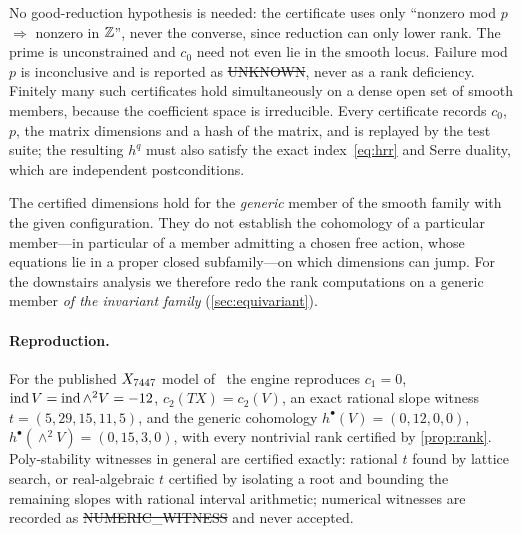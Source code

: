 No good-reduction hypothesis is needed: the certificate uses only
``nonzero mod $p$ $\Rightarrow$ nonzero in $\mathbb{Z}$'', never the converse, since
reduction can only lower rank. The prime is unconstrained and $c_0$ need not
even lie in the smooth locus. Failure mod $p$ is inconclusive and is reported as
\st{UNKNOWN}, never as a rank deficiency. Finitely many such certificates hold
simultaneously on a dense open set of smooth members, because the coefficient
space is irreducible. Every certificate records $c_0$, $p$, the matrix
dimensions and a hash of the matrix, and is replayed by the test suite; the
resulting $h^q$ must also satisfy the exact index~\eqref{eq:hrr} and Serre
duality, which are independent postconditions.

\begin{remark}[Scope]
The certified dimensions hold for the \emph{generic} member of the smooth
family with the given configuration. They do not establish the cohomology of a
particular member---in particular of a member admitting a chosen free action,
whose equations lie in a proper closed subfamily---on which dimensions can jump.
For the downstairs analysis we therefore redo the rank computations on a
generic member \emph{of the invariant family} (\cref{sec:equivariant}).
\end{remark}

\paragraph{Reproduction.} For the published $X_{7447}$ model of~\cite{ACGLP2013}
the engine reproduces $c_1=0$, $\operatorname{ind} V=\operatorname{ind}\wedge^2V=-12$, $c_2(TX)=c_2(V)$, an
exact rational slope witness $t=(5,29,15,11,5)$, and the generic cohomology
$h^\bullet(V)=(0,12,0,0)$, $h^\bullet(\wedge^2V)=(0,15,3,0)$, with every nontrivial
rank certified by \cref{prop:rank}. Poly-stability witnesses in general are
certified exactly: rational $t$ found by lattice search, or real-algebraic $t$
certified by isolating a root and bounding the remaining slopes with rational
interval arithmetic; numerical witnesses are recorded as
\st{NUMERIC\_WITNESS} and never accepted.

